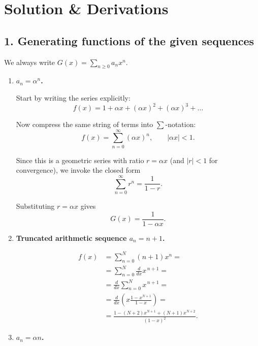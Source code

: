 \documentclass[docmute]{article}
\begin{document}
\section*{Solution \& Derivations}

\subsection*{1. Generating functions of the given sequences}%
We always write $G(x)=\sum_{n\ge0}a_{n}x^{n}$.

\begin{enumerate}[label=\textbf{1(\alph*)}\quad]

\item \textbf{$a_n=\alpha^{n}$.}

Start by writing the series explicitly:
\[
f(x)=1+\alpha x+(\alpha x)^2+(\alpha x)^3+\dots
\]

Now compress the same string of terms into $\sum$-notation:
\[
f(x)=\sum_{n=0}^{\infty}(\alpha x)^{n}, \qquad |\alpha x|<1.
\]

Since this is a geometric series with ratio \(r=\alpha x\) (and \(|r|<1\) for convergence), we invoke the closed form
\[
\sum_{n=0}^{\infty}r^{n}=\frac{1}{1-r}.
\]

Substituting \(r=\alpha x\) gives
\[
\boxed{G(x)=\frac{1}{1-\alpha x}}.
\]


\medskip
\item \textbf{Truncated arithmetic sequence \(a_n = n+1\).}

\[
\begin{aligned}
f(x)
  &=\sum_{n=0}^{N}(n+1)x^{n}=                              \\
  &=\sum_{n=0}^{N}\frac{d}{dx}x^{\,n+1}=                   \\
  &=\frac{d}{dx}\sum_{n=0}^{N}x^{\,n+1}=                   \\
  &=\frac{d}{dx}\!\left(x\frac{1-x^{N+1}}{1-x}\right)=     \\
  &=\frac{1-(N+2)x^{N+1}+(N+1)x^{N+2}}{(1-x)^{2}}.
\end{aligned}
\]



\medskip
\item \textbf{$a_n=\alpha n$.}


\end{enumerate}
\end{document}
